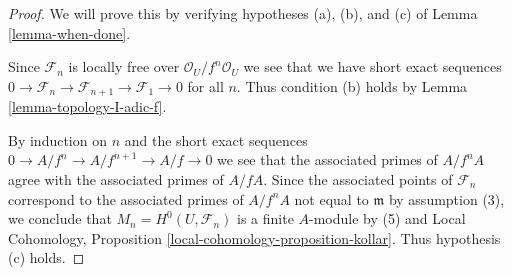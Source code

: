 \begin{proof}
We will prove this by verifying hypotheses (a), (b), and (c) of
Lemma \ref{lemma-when-done}.

\medskip\noindent
Since $\mathcal{F}_n$ is locally free over $\mathcal{O}_U/f^n\mathcal{O}_U$
we see that we have short exact sequences
$0 \to \mathcal{F}_n \to \mathcal{F}_{n + 1} \to \mathcal{F}_1 \to 0$
for all $n$. Thus condition (b) holds by Lemma \ref{lemma-topology-I-adic-f}.

\medskip\noindent
By induction on $n$ and the short exact sequences
$0 \to A/f^n \to A/f^{n + 1} \to A/f \to 0$ we see that
the associated primes of $A/f^nA$ agree with the associated
primes of $A/fA$. Since the associated points of $\mathcal{F}_n$
correspond to the associated primes of $A/f^nA$ not equal to $\mathfrak m$
by assumption (3), we conclude that
$M_n = H^0(U, \mathcal{F}_n)$ is a finite $A$-module by (5) and
Local Cohomology, Proposition \ref{local-cohomology-proposition-kollar}.
Thus hypothesis (c) holds.


\end{proof}
